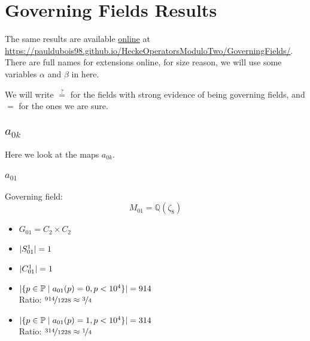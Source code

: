 
\section{Governing Fields Results}
\label{governingFieldsResults}
The same results are available \href{https://pauldubois98.github.io/HeckeOperatorsModuloTwo/GoverningFields/}{online} at \url{https://pauldubois98.github.io/HeckeOperatorsModuloTwo/GoverningFields/}.
There are full names for extensions online, for size reason, we will use some variables $\alpha$ and $\beta$ in here.

We will write $\stackrel{?}{=}$ for the fields with strong evidence of being governing fields, and $=$ for the ones we are sure.

\subsection{$a_{0k}$}
Here we look at the maps $a_{0k}$.

\subsubsection{$a_{01}$}
Governing field:
$$M_{01} = \mathbb{Q}\left(\zeta_8\right)$$
\begin{multicols}{2}
	\begin{itemize}
		\item $G_{01} = C_2 \times C_2$
		\item $| S_{01}^1 | = 1$
		\item $| C_{01}^1 | = 1$
	\end{itemize}
	\begin{itemize}
		\item $| \{ p \in \mathbb{P} \mid a_{01}(p)=0, p<10^4 \} | = 914$\\
		Ratio: $\nicefrac{ 914 }{ 1228 } \approx \nicefrac{ 3 }{ 4 }$
		\item $| \{ p \in \mathbb{P} \mid a_{01}(p)=1, p<10^4 \} | = 314$\\
		Ratio: $\nicefrac{ 314 }{ 1228 } \approx \nicefrac{ 1 }{ 4 }$
	\end{itemize}
\end{multicols}

